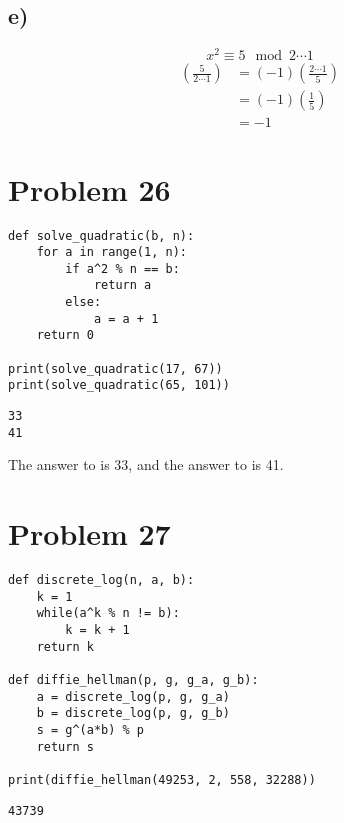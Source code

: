 \documentclass{article}
\theoremstyle{definition}
\begin{document}
\subsection*{e)}
\[
    x^2 \equiv 5 \mod{2\cdots 1}
\]
\begin{align}
    \left(\frac{5}{2\cdots 1}\right)
    & = (-1)\left(\frac{2\cdots 1}{5}\right)\\
    & = (-1)\left(\frac{1}{5}\right) \\
    & = -1
\end{align}
\section*{Problem 26}
\begin{mdframed}[]
    \begin{verbatim}
def solve_quadratic(b, n):
    for a in range(1, n):
        if a^2 % n == b:
            return a
        else:
            a = a + 1
    return 0

print(solve_quadratic(17, 67))
print(solve_quadratic(65, 101))
    \end{verbatim}
    \begin{verbatim}
33
41
    \end{verbatim}
\end{mdframed}
The answer to  is 33, and the answer to  is 41.
\section*{Problem 27}
\begin{mdframed}
    \begin{verbatim}
def discrete_log(n, a, b):
    k = 1
    while(a^k % n != b):
        k = k + 1
    return k

def diffie_hellman(p, g, g_a, g_b):
    a = discrete_log(p, g, g_a)
    b = discrete_log(p, g, g_b)
    s = g^(a*b) % p
    return s

print(diffie_hellman(49253, 2, 558, 32288))
    \end{verbatim}
    \begin{verbatim}
43739
    \end{verbatim}
\end{mdframed}
\end{document}
